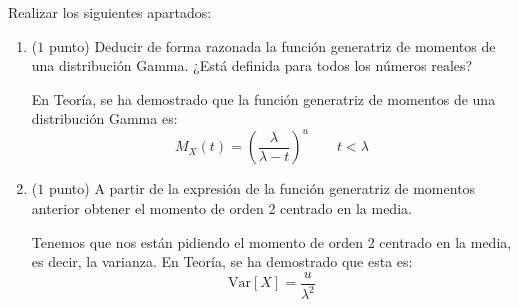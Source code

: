 \documentclass[12pt]{article}
\begin{document}
    \begin{ejercicio}
        Realizar los siguientes apartados:
        \begin{enumerate}
            \item ($1$ punto) Deducir de forma razonada la función generatriz de momentos de una distribución Gamma. ¿Está definida para todos los números reales?
            
            En Teoría, se ha demostrado que la función generatriz de momentos de una distribución Gamma es:
            \begin{equation*}
                M_X(t) = \left(\dfrac{\lambda}{\lambda - t}\right)^u \qquad t < \lambda
            \end{equation*}

            \item ($1$ punto) A partir de la expresión de la función generatriz de momentos anterior obtener el momento de orden 2 centrado en la media.
            
            Tenemos que nos están pidiendo el momento de orden 2 centrado en la media, es decir, la varianza.
            En Teoría, se ha demostrado que esta es:
            \begin{equation*}
                \text{Var}[X] = \dfrac{u}{\lambda^2}
            \end{equation*}
        \end{enumerate}
    \end{ejercicio}
\end{document}
